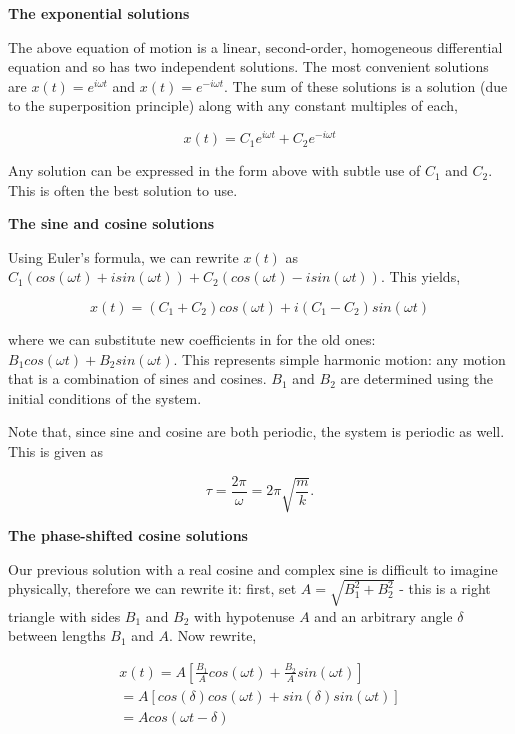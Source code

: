 {\bfseries \noindent The exponential solutions}

The above equation of motion is a linear, second-order, homogeneous differential equation and so has two independent solutions. The most convenient solutions are $x(t) = e^{i \omega t}$ and $x(t) = e^{-i \omega t}$. The sum of these solutions is a solution (due to the superposition principle) along with any constant multiples of each,

\begin{equation*}
    x(t) = C_1  e^{i \omega t} + C_2  e^{-i \omega t}
\end{equation*}

Any solution can be expressed in the form above with subtle use of $C_1$ and $C_2$. This is often the best solution to use.


{\vspace{0.35cm} \bfseries \noindent The sine and cosine solutions}

Using Euler's formula, we can rewrite $x(t)$ as $C_1 (cos(\omega t) + i sin(\omega t)) + C_2  (cos(\omega t) - i sin(\omega t))$. This yields,

\begin{equation*}
    x(t) = (C_1 + C_2)cos(\omega t) + i(C_1 - C_2)sin(\omega t)
\end{equation*}

\noindent where we can substitute new coefficients in for the old ones: $B_1 cos(\omega t) + B_2 sin(\omega t)$. This represents simple harmonic motion: any motion that is a combination of sines and cosines. $B_1$ and $B_2$ are determined using the initial conditions of the system.

Note that, since sine and cosine are both periodic, the system is periodic as well. This is given as

\begin{equation*}
    \tau = \frac{2 \pi}{\omega} = 2\pi \sqrt{\frac{m}{k}}.
\end{equation*}


{\vspace{0.35cm} \bfseries \noindent The phase-shifted cosine solutions}

Our previous solution with a real cosine and complex sine is difficult to imagine physically, therefore we can rewrite it: first, set $A = \sqrt{B_1^2 + B_2^2}$ - this is a right triangle with sides $B_1$ and $B_2$ with hypotenuse $A$ and an arbitrary angle $\delta$ between lengths $B_1$ and $A$. Now rewrite,

\begin{gather*}
    x(t) = A [\frac{B_1}{A}cos(\omega t) + \frac{B_2}{A} sin(\omega t)] \\
    = A[cos(\delta) cos(\omega t) + sin(\delta) sin(\omega t)] \\
    = A cos(\omega t - \delta)
\end{gather*}


